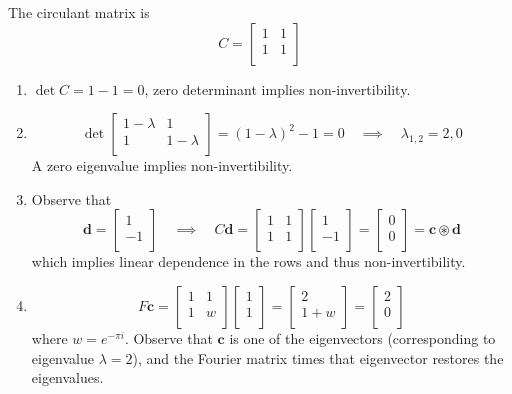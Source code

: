 \documentclass[a4paper]{article}
\begin{document}
The circulant matrix is
\[
	C = \begin{bmatrix}
		1 & 1\\
		1 & 1\\
	\end{bmatrix} 
\]
\begin{enumerate}[label=(\arabic*)]
	\item \( \det C = 1 - 1 = 0 \), zero determinant implies non-invertibility.
	\item \[
		\det \begin{bmatrix}
			1 - \lambda & 1\\
			1 & 1 - \lambda\\
		\end{bmatrix} = \!\left( 1 - \lambda \right)^{2} - 1 = 0 \quad \implies \quad \lambda_{1,2} = 2, 0
	\]
	A zero eigenvalue implies non-invertibility.
	\item Observe that
	\[
		\pmb{d} = \begin{bmatrix}
			1\\
			-1\\
		\end{bmatrix} \quad \implies \quad C \pmb{d} =
		\begin{bmatrix}
			1 & 1\\
			1 & 1\\
		\end{bmatrix}
		\begin{bmatrix}
			1\\
			-1\\
		\end{bmatrix} = 
		\begin{bmatrix}
			0\\
			0\\
		\end{bmatrix} = 
		\pmb{c \circledast d}
	\]
	which implies linear dependence in the rows and thus non-invertibility.
	\item \[
		F \pmb{c} = \begin{bmatrix}
			1 & 1\\
			1 & w\\
		\end{bmatrix} 
		\begin{bmatrix}
			1\\
			1\\
		\end{bmatrix}
		= 
		\begin{bmatrix}
			2\\
			1 + w\\
		\end{bmatrix}
		= 
		\begin{bmatrix}
			2\\
			0\\
		\end{bmatrix}
	\]
	where \( w = e^{-\pi i} \). Observe that \( \pmb{c} \) is one of the eigenvectors (corresponding to eigenvalue \( \lambda = 2 \)), and the Fourier matrix times that eigenvector restores the eigenvalues.
\end{enumerate}
\end{document}
